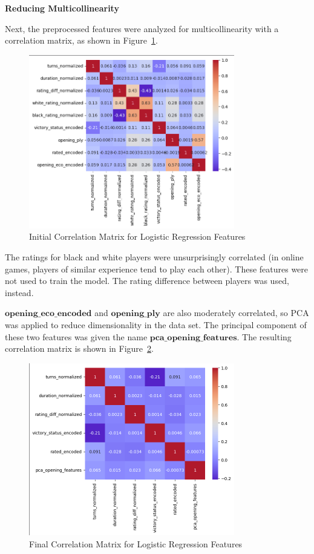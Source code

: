 \documentclass[12pt]{article}
\begin{document}
\noindent\textbf{Reducing Multicollinearity}

Next, the preprocessed features were analyzed for multicollinearity with a correlation matrix, as shown in Figure~\ref{fig:corr-matrix-1}.

\begin{figure}[H]
\centering
\includegraphics[width=0.8\textwidth]{corr-matrix-1.png}
\caption{Initial Correlation Matrix for Logistic Regression Features}
\label{fig:corr-matrix-1}
\end{figure}

The ratings for black and white players were unsurprisingly correlated (in online games, players of similar experience tend to play each other). These features were not used to train the model. The rating difference between players was used, instead.

$\textbf{opening\_eco\_encoded}$ and $\textbf{opening\_ply}$ are also moderately correlated, so PCA was applied to reduce dimensionality in the data set. The principal component of these two features was given the name $\textbf{pca\_opening\_features}$. The resulting correlation matrix is shown in Figure~\ref{fig:corr-matrix-2}.

\begin{figure}[H]
\centering
\includegraphics[width=0.8\textwidth]{corr-matrix-2.png}
\caption{Final Correlation Matrix for Logistic Regression Features}
\label{fig:corr-matrix-2}
\end{figure}
\end{document}
